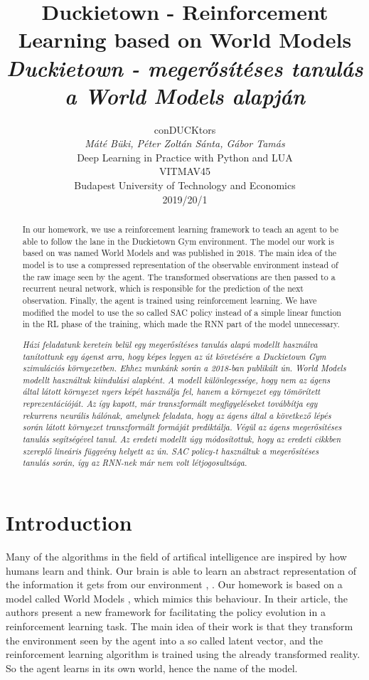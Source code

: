 \documentclass{article}
\title{Duckietown - Reinforcement Learning based on World Models\\ \textit{Duckietown - megerősítéses tanulás a World Models alapján}}
\author{%
  conDUCKtors\\
  \textit{Máté Büki, Péter Zoltán Sánta, Gábor Tamás}\\
  Deep Learning in Practice with Python and LUA\\
  VITMAV45\\
  Budapest University of Technology and Economics \\
  2019/20/1
}
\begin{document}
\maketitle

\begin{abstract}
In our homework, we use a reinforcement learning framework to teach an agent to be able to follow the lane in the Duckietown Gym environment. The model our work is based on was named World Models \cite{worldmodels} and was published in 2018. The main idea of the model is to use a compressed representation of the observable environment instead of the raw image seen by the agent. The transformed observations are then passed to a recurrent neural network, which is responsible for the prediction of the next observation. Finally, the agent is trained using reinforcement learning. We have modified the model to use the so called SAC policy instead of a simple linear function in the RL phase of the training, which made the RNN part of the model unnecessary.\newline

\textit{Házi feladatunk keretein belül egy megerősítéses tanulás alapú modellt használva tanítottunk egy ágenst arra, hogy képes legyen az út követésére a Duckietown Gym szimulációs környezetben. Ehhez munkánk során a 2018-ban publikált ún. World Models \cite{worldmodels} modellt használtuk kiindulási alapként. A modell különlegessége, hogy nem az ágens által látott környezet nyers képét használja fel, hanem a környezet egy tömörített reprezentációját. Az így kapott, már transzformált megfigyeléseket továbbítja egy rekurrens neurális hálónak, amelynek feladata, hogy az ágens által a következő lépés során látott környezet transzformált formáját prediktálja. Végül az ágens megerősítéses tanulás segítségével tanul. Az eredeti modellt úgy módosítottuk, hogy az eredeti cikkben szereplő lineáris függvény helyett az ún. SAC policy-t használtuk a megerősítéses tanulás során, így az RNN-nek már nem volt létjogosultsága.}
\end{abstract}

\section{Introduction}

Many of the algorithms in the field of artifical intelligence are inspired by how humans learn and think. Our brain is able to learn an abstract representation of the information it gets from our environment \cite{brain1}, \cite{brain2}. Our homework is based on a model called World Models \cite{worldmodels}, which mimics this behaviour. In their article, the authors present a new framework for facilitating the policy evolution in a reinforcement learning task. The main idea of their work is that they transform the environment seen by the agent into a so called latent vector, and the reinforcement learning algorithm is trained using the already transformed reality. So the agent learns in its own world, hence the name of the model.
\end{document}
